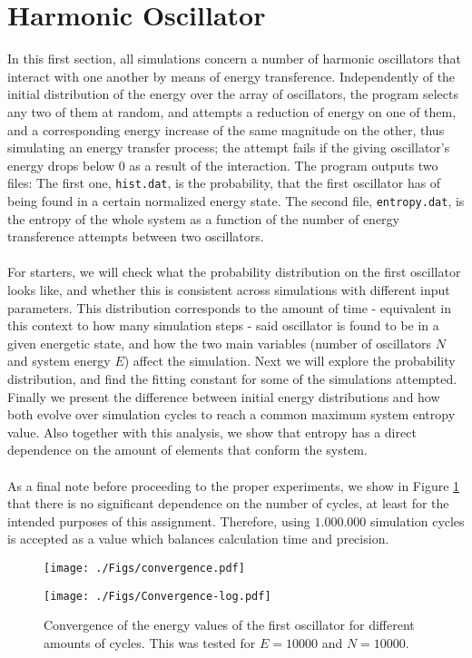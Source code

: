 \documentclass[a4paper, 12pt, notitlepage]{article}
\begin{document}
\section*{Harmonic Oscillator}
In this first section, all simulations concern a number of harmonic oscillators that interact with one another by means of energy transference. Independently of the initial distribution of the energy over the array of oscillators, the program selects any two of them at random, and attempts a reduction of energy on one of them, and a corresponding energy increase of the same magnitude on the other, thus simulating an energy transfer process; the attempt fails if the giving oscillator's energy drops below 0 as a result of the interaction. The program outputs two files: The first one, \texttt{hist.dat}, is the probability, that the first oscillator has of being found in a certain normalized energy state. The second file, \texttt{entropy.dat}, is the entropy of the whole system as a function of the number of energy transference attempts between two oscillators.\\\\
For starters, we will check what the probability distribution on the first oscillator looks like, and whether this is consistent across simulations with different input parameters. This distribution corresponds to the amount of time - equivalent in this context to how many simulation steps - said oscillator is found to be in a given energetic state, and how the two main variables (number of oscillators $N$ and system energy $E$) affect the simulation. Next we will explore the probability distribution, and find the fitting constant for some of the simulations attempted. Finally we present the difference between initial energy distributions and how both evolve over simulation cycles to reach a common maximum system entropy value. Also together with this analysis, we show that entropy has a direct dependence on the amount of elements that conform the system.\\\\
As a final note before proceeding to the proper experiments, we show in Figure \ref{fig:fig1} that there is no significant dependence on the number of cycles, at least for the intended purposes of this assignment. Therefore, using $1.000.000$ simulation cycles is accepted as a value which balances calculation time and precision.
\begin{figure}[h]
	\begin{minipage}{0.5\textwidth}
		\texttt{[image: ./Figs/convergence.pdf]}
	\end{minipage}
	\begin{minipage}{0.3\textwidth}
		\texttt{[image: ./Figs/Convergence-log.pdf]}
	\end{minipage}
\caption{Convergence of the energy values of the first oscillator for different amounts of cycles. This was tested for $E=10000$ and $N=10000$.}\label{fig:fig1}
\end{figure}
\end{document}
